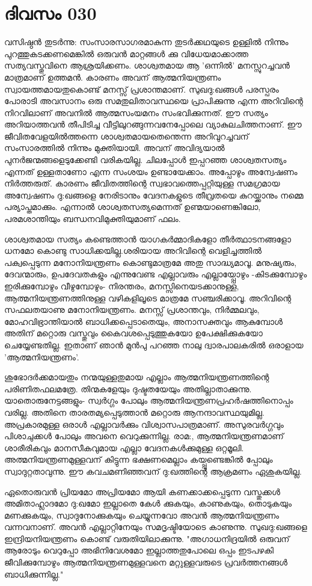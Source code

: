  
\section{ദിവസം 030}


വസിഷ്ഠന്‍ തുടര്‍ന്നു: സംസാരസാഗരമാകുന്ന തുടര്‍ക്കഥയുടെ ഉള്ളില്‍ നിന്നും പുറത്തുകടക്കണമെങ്കില്‍ ഒരുവന്‍ മാറ്റങ്ങള്‍ ക്കു വിധേയമാക്കാത്ത സത്യവസ്തുവിനെ ആശ്രയിക്കണം. ശാശ്വതമായ ആ 'ഒന്നില്‍' മനസ്സുറച്ചവന്‍ മാത്രമാണ്‌ ഉത്തമന്‍. കാരണം അവന്‌ ആത്മനിയന്ത്രണം സ്വായത്തമായതുകൊണ്ട്‌ മനസ്സ്‌ പ്രശാന്തമാണ്‌. സുഖദു:ഖങ്ങള്‍ പരസ്പരം പോരാടി അവസാനം ഒരു സമതുലിതാവസ്ഥയെ പ്രാപിക്കുന്നു എന്ന അറിവിന്റെ നിറവിലാണ്‌ അവനില്‍ ആത്മസംയമനം സംഭവിക്കുന്നത്‌. ഈ സത്യം അറിയാത്തവന്‍ തീപിടിച്ച വീട്ടിലുറങ്ങുന്നവനേപ്പോലെ വ്യാകുലചിത്തനാണ്‌. ഈ ജീവിതവേളയില്‍ത്തന്നെ ശാശ്വതമായതെന്തെന്ന അറിവുറച്ചവന്‌ സംസാരത്തില്‍ നിന്നും മുക്തിയായി. അവന്‌ അവിദ്യയാല്‍ പുനര്‍ജന്മങ്ങളെടുക്കേണ്ടി വരികയില്ല. ചിലപ്പോള്‍ ഇപ്പറഞ്ഞ ശാശ്വതസത്യം എന്നത്‌ ഉള്ളതാണോ എന്ന സംശയം ഉണ്ടായേക്കാം. അപ്പോഴും അന്വേഷണം നിര്‍ത്തരുത്‌. കാരണം ജീവിതത്തിന്റെ സ്വഭാവത്തെപ്പറ്റിയുള്ള സമഗ്രമായ അന്വേഷണം ദു:ഖങ്ങളെ നേരിടാനും വേദനകളുടെ തീവ്രതയെ കുറയ്ക്കാനും നമ്മെ പര്യാപ്തമാക്കും. എന്നാല്‍ ശാശ്വതസത്യമെന്നത്‌ ഉണ്മയാണെങ്കിലോ, പരമശാന്തിയും ബന്ധനവിമുക്തിയുമാണ്‌ ഫലം.

ശാശ്വതമായ സത്യം കണ്ടെത്താന്‍ യാഗകര്‍മ്മാദികളോ തീര്‍ത്ഥാടനങ്ങളോ ധനമോ കൊണ്ടു സാധിക്കയില്ല.ശരിയായ അറിവിന്റെ വെളിച്ചത്തില്‍ പക്വപ്പെടുന്ന മനോനിയന്ത്രണം കൊണ്ടുമാത്രമേ അതു സാദ്ധ്യമാവൂ. മനുഷ്യരും, ദേവന്മാരും, ഉപദേവതകളും എന്നുവേണ്ട എല്ലാവരും എല്ലായ്പ്പോഴും -കിടക്കുമ്പോഴും ഇരിക്കുമ്പോഴും വീഴുമ്പോഴും- നിരന്തരം, മനസ്സിനെയടക്കാനുള്ള, ആത്മനിയന്ത്രണത്തിനുള്ള വഴികളിലൂടെ മാത്രമേ സഞ്ചരിക്കാവൂ. അറിവിന്റെ സഫലതയാണു മനോനിയന്ത്രണം. മനസ്സ്‌ പ്രശാന്തവും, നിര്‍മ്മലവും, മോഹവിഭ്രാന്തിയാല്‍ ബാധിക്കപ്പെടാതെയും, അനാസക്തവും ആകുമ്പോള്‍ അതിന്‌ മറ്റൊരു വസ്തുവും കൈവശപ്പെടുത്തുകയോ ഉപേക്ഷിക്കുകയോ ചെയ്യേണ്ടതില്ല. ഇതാണ്‌ ഞാന്‍ മുന്‍പു പറഞ്ഞ നാലു ദ്വാരപാലകരില്‍ ഒരാളായ 'ആത്മനിയന്ത്രണം'.

ശുഭോദര്‍ക്കമായതും നന്മയുള്ളതുമായ എല്ലാം ആത്മനിയന്ത്രണത്തിന്റെ പരിണിതഫലമത്രേ. തിന്മകളേയും ദുഷ്ടതയേയും അതില്ലാതാക്കുന്നു. യാതൊരുനേട്ടങ്ങളും- സ്വര്‍ഗ്ഗം പോലും ആത്മനിയന്ത്രണപ്രഹര്‍ഷത്തിനൊപ്പം വരില്ല. അതിനെ താരതമ്യപ്പെടുത്താന്‍ മറ്റൊരു ആനന്ദാവസ്ഥയുമില്ല. അപ്രകാരമുള്ള ഒരാള്‍ എല്ലാവര്‍ക്കും വിശ്വാസപാത്രമാണ്‌. അസുരവര്‍ഗ്ഗവും പിശാചുക്കള്‍ പോലും അവനെ വെറുക്കുന്നില്ല. രാമ:, ആത്മനിയന്ത്രണമാണ്‌ ശാരീരികവും മാനസീകവുമായ എല്ലാ വേദനകള്‍ക്കുമുള്ള ഒറ്റമൂലി. അത്മനിയന്ത്രണമുള്ളവന്‌ കിട്ടുന്ന ഭക്ഷണമെല്ലാം കയ്പ്പുണ്ടെങ്കില്‍ പ്പോലും സ്വാദുറ്റതാവുന്നു. ഈ കവചമണിഞ്ഞവന്‌ ദു:ഖത്തിന്റെ ആക്രമണം ഏശുകയില്ല. 

ഏതൊരുവന്‍ പ്രിയമോ അപ്രിയമോ ആയി കണക്കാക്കപ്പെടുന്ന വസ്തുക്കള്‍ അമിതാഹ്ലാദമോ ദു:ഖമോ ഇല്ലാതെ കേള്‍ ക്കുകയും, കാണുകയും, തൊടുകയും മണക്കുകയും, സ്വാദുനോക്കുകയും ചെയ്യുന്നവോ അവന്‍ ആത്മനിയന്ത്രണം വന്നവനാണ്‌. അവന്‍ എല്ലാറ്റിനേയും സമദൃഷ്ടിയോടെ കാണുന്നു. സുഖദു:ഖങ്ങളെ ഇന്ദ്രിയനിയന്ത്രണം കൊണ്ട്‌ വരുതിയിലാക്കുന്നു. "അഗാധനിദ്രയില്‍ ഒരുവന്‌ ആരോടും വെറുപ്പോ അഭിനിവേശമോ ഇല്ലാത്തതുപോലെ ഒപ്പം ഇടപഴകി ജീവിക്കുമ്പോഴും ആത്മനിയന്ത്രണമുള്ളവനെ മറ്റുള്ളവരുടെ പ്രവര്‍ത്തനങ്ങള്‍ ബാധിക്കുന്നില്ല."
